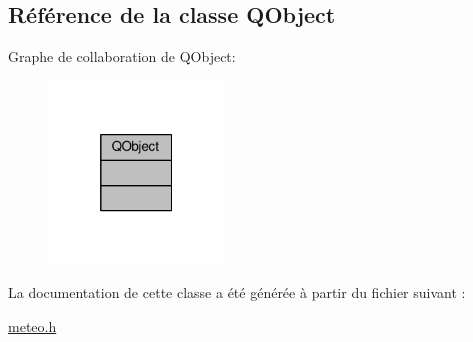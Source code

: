 \hypertarget{class_q_object}{}\subsection{Référence de la classe Q\+Object}
\label{class_q_object}


Graphe de collaboration de Q\+Object\+:\nopagebreak
\begin{figure}[H]
\begin{center}
\leavevmode
\includegraphics[width=133pt]{class_q_object__coll__graph}
\end{center}
\end{figure}


La documentation de cette classe a été générée à partir du fichier suivant \+:\begin{DoxyCompactItemize}
\item 
\hyperlink{meteo_8h}{meteo.\+h}\end{DoxyCompactItemize}
